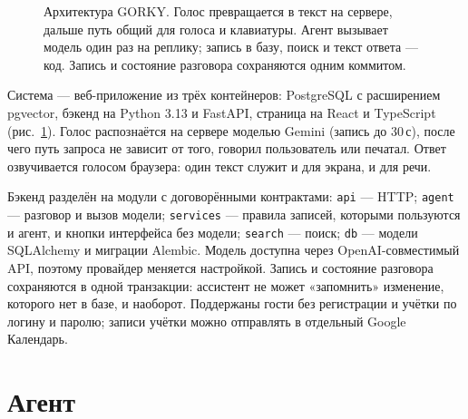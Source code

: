 \documentclass[10pt,a4paper,twocolumn]{article}
\newcommand{\code}[1]{\texttt{#1}}
\begin{document}
\begin{figure}[t]
{}
\caption{Архитектура GORKY. Голос превращается в текст на сервере, дальше путь общий для
голоса и клавиатуры. Агент вызывает модель один раз на реплику; запись в базу, поиск и
текст ответа — код. Запись и состояние разговора сохраняются одним коммитом.}
\label{fig:arch}
\end{figure}

Система — веб-приложение из трёх контейнеров: PostgreSQL с расширением pgvector,
бэкенд на Python 3.13 и FastAPI, страница на React и TypeScript (рис.~\ref{fig:arch}).
Голос распознаётся на сервере моделью Gemini (запись до 30\,с), после чего путь
запроса не зависит от того, говорил пользователь или печатал. Ответ озвучивается
голосом браузера: один текст служит и для экрана, и для речи.

Бэкенд разделён на модули с договорёнными контрактами: \code{api} — HTTP; \code{agent} —
разговор и вызов модели; \code{services} — правила записей, которыми пользуются и агент,
и кнопки интерфейса без модели; \code{search} — поиск; \code{db} — модели SQLAlchemy и
миграции Alembic. Модель доступна через OpenAI-совместимый API, поэтому провайдер
меняется настройкой. Запись и состояние разговора сохраняются в одной транзакции:
ассистент не может «запомнить» изменение, которого нет в базе, и наоборот. Поддержаны
гости без регистрации и учётки по логину и паролю; записи учётки можно отправлять в
отдельный Google Календарь.

\section{Агент}
\end{document}
